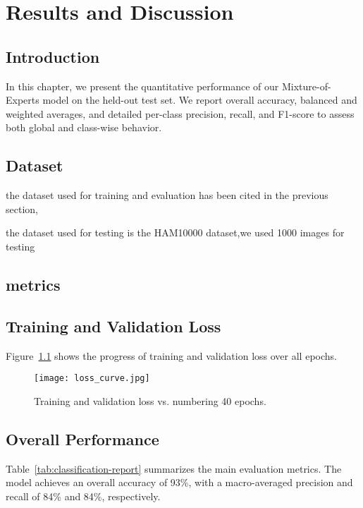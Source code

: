 \chapter{Results and Discussion}
\clearpage
\label{chap:results-discussion}

\section{Introduction}
In this chapter, we present the quantitative performance of our Mixture-of-Experts model on the held-out test set. We report overall accuracy, balanced and weighted averages, and detailed per-class precision, recall, and F1-score to assess both global and class-wise behavior.
\section{Dataset}
the dataset used for training and evaluation has been cited in the previous section,

the dataset used for testing is the HAM10000 dataset,we used 1000 images for  testing  
\section{metrics}
\section{Training and Validation Loss}
Figure~\ref{fig:loss-curve} shows the progress of training and validation loss over all epochs.

\begin{figure}[h!]
  \centering
  \texttt{[image: loss\_curve.jpg]}
  \caption{Training and validation loss vs.
numbering 40 epochs.}
  \label{fig:loss-curve}
\end{figure}
\section{Overall Performance}
Table~\ref{tab:classification-report} summarizes the main evaluation metrics. The model achieves an overall accuracy of 93\%, with a macro-averaged precision and recall of 84\% and 84\%, respectively.

